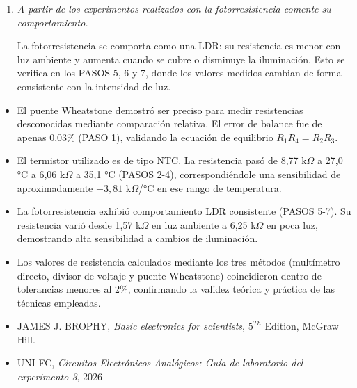 \documentclass[12pt,a4paper]{article}
\begin{document}
\begin{enumerate}
El termistor es de tipo NTC, porque en los PASOS 2, 3 y 4 su resistencia disminuye cuando aumenta la temperatura. Ese comportamiento se repite tanto en la medición directa como en el divisor de voltaje y en el puente Wheatstone.

\item \textit{A partir de los experimentos realizados con la fotorresistencia comente su comportamiento.}
\smallskip

La fotorresistencia se comporta como una LDR: su resistencia es menor con luz ambiente y aumenta cuando se cubre o disminuye la iluminación. Esto se verifica en los PASOS 5, 6 y 7, donde los valores medidos cambian de forma consistente con la intensidad de luz.
\end{enumerate}


\begin{itemize}
	\item El puente Wheatstone demostró ser preciso para medir resistencias desconocidas mediante comparación relativa. El error de balance fue de apenas 0,03\% (PASO 1), validando la ecuación de equilibrio $R_1 R_4 = R_2 R_3$.
	\item El termistor utilizado es de tipo NTC. La resistencia pasó de 8,77 k$\Omega$ a 27,0 °C a 6,06 k$\Omega$ a 35,1 °C (PASOS 2-4), correspondiéndole una sensibilidad de aproximadamente $-3,81$ k$\Omega$/°C en ese rango de temperatura.
	\item La fotorresistencia exhibió comportamiento LDR consistente (PASOS 5-7). Su resistencia varió desde 1,57 k$\Omega$ en luz ambiente a 6,25 k$\Omega$ en poca luz, demostrando alta sensibilidad a cambios de iluminación.
	\item Los valores de resistencia calculados mediante los tres métodos (multímetro directo, divisor de voltaje y puente Wheatstone) coincidieron dentro de tolerancias menores al 2\%, confirmando la validez teórica y práctica de las técnicas empleadas.
\end{itemize}

    \begin{itemize}
        \item JAMES J. BROPHY, \textit{Basic electronics for scientists}, $5^{Th}$ Edition, McGraw Hill.
        \item UNI-FC, \textit{Circuitos Electrónicos Analógicos: Guía de laboratorio del experimento 3}, 2026
    \end{itemize}
\end{document}
